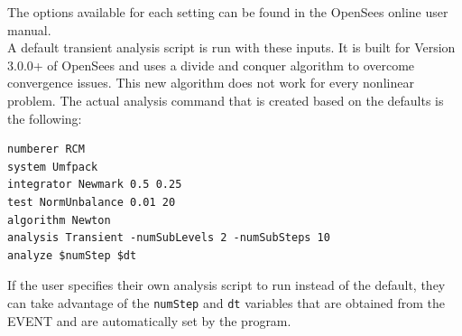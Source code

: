 The options available for each setting can be found in the OpenSees online user
manual.\\

A default transient analysis script is run with these inputs. It is
built for Version 3.0.0+ of OpenSees and uses a divide and conquer
algorithm to overcome convergence issues. This new algorithm
does not work for every nonlinear problem. The actual analysis command
that is created based on the defaults is the following:

\begin{verbatim}
numberer RCM
system Umfpack
integrator Newmark 0.5 0.25
test NormUnbalance 0.01 20 
algorithm Newton
analysis Transient -numSubLevels 2 -numSubSteps 10 
analyze $numStep $dt
\end{verbatim}

If the user specifies their own analysis script to run
instead of the default, they can take advantage of the \texttt{numStep} and \texttt{dt} variables that
are obtained from the EVENT and are automatically set by the program.